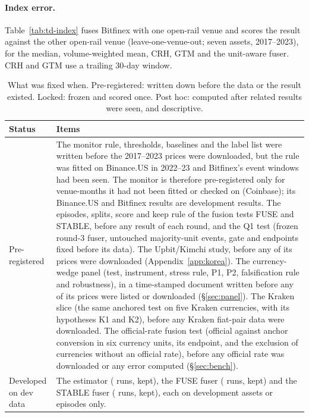 \documentclass[sigconf,review,anonymous]{acmart}
\begin{document}
\paragraph{Index error.} Table~\ref{tab:td-index} fuses Bitfinex with one open-rail venue and scores the result against the other
open-rail venue (leave-one-venue-out; seven assets, 2017--2023), for the median, volume-weighted mean, CRH, GTM and the unit-aware fuser. CRH and GTM use a trailing 30-day window.

\begin{table}[!tb]
\scriptsize
\caption{What was fixed when. Pre-registered: written down before the data or the result existed. Locked: frozen and scored once. Post hoc: computed after related results were seen, and descriptive.}
\label{tab:fixed}
\setlength{\tabcolsep}{3pt}
\begin{tabular}{@{}lp{}@{}}
\toprule
Status & Items \\
\midrule
Pre-registered & The monitor rule, thresholds, baselines and the label list were written before the 2017--2023 prices were
downloaded, but the rule was fitted on Binance.US in 2022--23 and Bitfinex's event windows had been seen. The monitor is
therefore pre-registered only for venue-months it had not been fitted or checked on (Coinbase); its Binance.US and Bitfinex
results are development results. The episodes, splits, score and keep rule of the fusion tests FUSE and STABLE, before any
result of each round, and the Q1 test (frozen round-3 fuser, untouched majority-unit events, gate and endpoints fixed before
its data). The Upbit/Kimchi study, before any of its prices
were downloaded (Appendix~\ref{app:korea}). The currency-wedge panel (test, instrument, stress rule, P1, P2, falsification rule and robustness), in a time-stamped document written before any of its prices
were listed or downloaded (\S\ref{sec:panel}). The Kraken slice (the same anchored test on five Kraken currencies, with its hypotheses K1 and K2), before any Kraken
fiat-pair data were downloaded. The official-rate fusion test (official against anchor conversion in six currency units, its endpoint, and the exclusion of
currencies without an official rate), before any official rate was downloaded or any error computed (\S\ref{sec:bench}). \\
Developed on dev data & The estimator (\NumULoopIter{} runs, \NumULoopKept{} kept), the FUSE fuser (\NumBFuseLoopRuns{} runs,
\NumBFuseLoopKept{} kept) and the STABLE fuser (\NumBStableLoopRuns{} runs, \NumBStableLoopKept{} kept), each on development
assets or episodes only. \\

\end{tabular}
\end{table}
\end{document}
